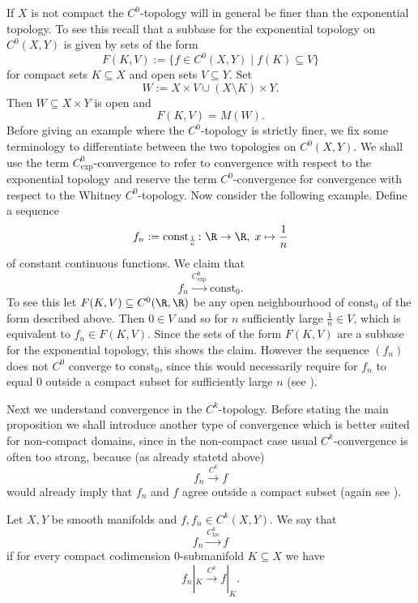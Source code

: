 \begin{remark}
    If $X$ is not compact the $C^0$-topology will in general be finer than the exponential topology. To see this recall that a subbase for the exponential topology on $C^0(X,Y)$ is given by sets of the form
    \[
    F(K,V) := \{f \in C^0(X,Y) \mid f(K) \subseteq V\}
    \]
    for compact sets $K \subseteq X$ and open sets $V \subseteq Y$. Set 
    \[
    W := X \times V \cup (X\setminus K) \times Y.
    \]
    Then $W \subseteq X \times Y$ is open and 
    \[
    F(K,V) = M(W).
    \]
    Before giving an example where the $C^0$-topology is strictly finer, we fix some terminology to differentiate between the two topologies on $C^0(X,Y)$. We shall use the term $C^0_\mathrm{exp}$-convergence to refer to convergence with respect to the exponential topology and reserve the term $C^0$-convergence for convergence with respect to the Whitney $C^0$-topology. Now consider the following example. Define a sequence 
    \[
    f_n := \mathrm{const}_{\frac{1}{n}}  \colon \R \to \R, \; x \mapsto \frac{1}{n}
    \]
    of constant continuous functions. We claim that 
    \[
    f_n \xrightarrow{C^0_\mathrm{exp}} \mathrm{const}_0.
    \]
    To see this let $F(K,V) \subseteq C^0(\R,\R)$ be any open neighbourhood of $\mathrm{const}_0$ of the form described above. Then $0 \in V$ and so for $n$ sufficiently large $\frac{1}{n} \in V$, which is equivalent to $f_n \in F(K,V)$. Since the sets of the form $F(K,V)$ are a subbase for the exponential topology, this shows the claim. However the sequence $(f_n)$ does not $C^0$ converge to $\mathrm{const}_0$, since this would necessarily require for $f_n$ to equal $0$ outside a compact subset for sufficiently large $n$ (see \cite{golubitsky2012stable}).
\end{remark}

Next we understand convergence in the $C^k$-topology. Before stating the main proposition we shall introduce another type of convergence which is better suited for non-compact domains, since in the non-compact case usual $C^k$-convergence is often too strong, because (as already statetd above) 
\[
f_n \xrightarrow{C^k} f
\]
would already imply that $f_n$ and $f$ agree outside a compact subset (again see \cite{golubitsky2012stable}).

\begin{definition}
    Let $X,Y$ be smooth manifolds and $f,f_n \in C^k(X,Y)$. We say that 
    \[
    f_n \xrightarrow{C^k_{\mathrm{loc}}} f
    \]
    if for every compact codimension $0$-submanifold $K \subseteq X$ we have 
    \[
    f_n|_K \xrightarrow{C^k} f|_K.
    \]
\end{definition}

